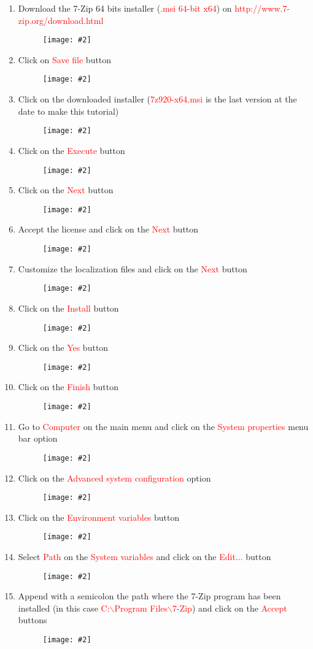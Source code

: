 \documentclass[a4paper]{article}
\newcommand{\FIG}[2]
{
	\begin{figure}[ht!]
	\centering
	\texttt{[image: \#2]}
	\end{figure}
}
\newcommand{\FIGURE}[1]{\FIG{0.35}{#1}}
\newcommand{\RED}[1] {\textcolor{red}{#1}}
\begin{document}
\begin{enumerate}

\item Download the 7-Zip 64 bits installer (\RED{.msi 64-bit x64}) on \newline
\RED{http://www.7-zip.org/download.html}

\FIGURE{7zip-1.png}

\clearpage

\item Click on \RED{Save file} button
\FIGURE{7zip-2.png}

\item Click on the downloaded installer (\RED{7z920-x64.msi} is the last version
at the date to make this tutorial)
\FIGURE{7zip-3.png}

\clearpage

\item Click on the \RED{Execute} button
\FIGURE{7zip-4.png}

\item Click on the \RED{Next} button
\FIGURE{7zip-5.png}

\clearpage

\item Accept the license and click on the \RED{Next} button
\FIGURE{7zip-6.png}

\item Customize the localization files and click on the \RED{Next} button
\FIGURE{7zip-7.png}

\clearpage

\item Click on the \RED{Install} button
\FIGURE{7zip-8.png}

\item Click on the \RED{Yes} button
\FIGURE{7zip-9.png}

\clearpage

\item Click on the \RED{Finish} button
\FIGURE{7zip-10.png}

\item Go to \RED{Computer} on the main menu and click on the
\RED{System properties} menu bar option
\FIGURE{7zip-11.png}

\clearpage

\item Click on the \RED{Advanced system configuration} option
\FIGURE{7zip-12.png}

\item Click on the \RED{Environment variables} button
\FIGURE{7zip-13.png}

\clearpage

\item Select \RED{Path} on the \RED{System variables} and click on the
\RED{Edit...} button
\FIGURE{7zip-14.png}

\item Append with a semicolon the path where the 7-Zip program has been
installed (in this case \RED{C:$\backslash$Program Files$\backslash$7-Zip}) and
click on the \RED{Accept} buttons
\FIGURE{7zip-15.png}

\end{enumerate}
\end{document}
